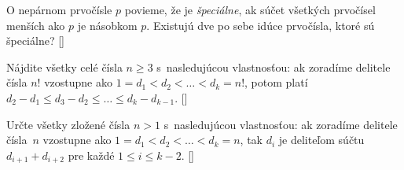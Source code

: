 {O nepárnom prvočísle $p$ povieme, že je \emph{špeciálne}, ak súčet všetkých prvočísel menších ako $p$ je násobkom $p$. Existujú dve po sebe idúce prvočísla, ktoré sú špeciálne?
    []

Nájdite všetky celé čísla $n \geq 3$ s~nasledujúcou vlastnosťou: ak zoradíme delitele čísla $n!$ vzostupne ako $1 = d_1 < d_2 < \dots < d_k = n!$, potom platí
$d_2 - d_1 \le d_3 - d_2 \le \dots \le {d_k - d_{k-1}}$.
    []

Určte všetky zložené čísla $n > 1$ s~nasledujúcou vlastnosťou: ak zoradíme delitele čísla~$n$ vzostupne ako $1 = d_1 < d_2 < \dots < d_k = n$, tak $d_i$ je deliteľom súčtu $ d_{i+1} + d_{i+2}$ pre každé $1 \le i\le k-2$.
    []

}

